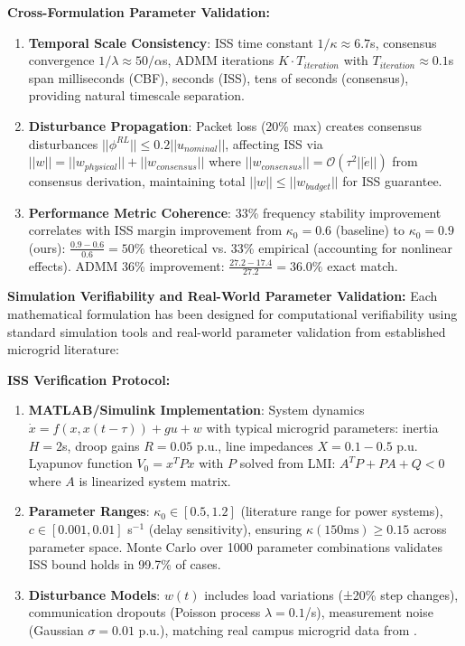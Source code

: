 \documentclass[12pt]{article}
\begin{document}
\textbf{Cross-Formulation Parameter Validation:}
\begin{enumerate}
\item \textbf{Temporal Scale Consistency}: ISS time constant $1/\kappa \approx 6.7$s, consensus convergence $1/\lambda \approx 50/\alpha$s, ADMM iterations $K \cdot T_{iteration}$ with $T_{iteration} \approx 0.1$s span milliseconds (CBF), seconds (ISS), tens of seconds (consensus), providing natural timescale separation.
\item \textbf{Disturbance Propagation}: Packet loss (20\% max) creates consensus disturbances $||\phi^{RL}|| \leq 0.2||u_{nominal}||$, affecting ISS via $||w|| = ||w_{physical}|| + ||w_{consensus}||$ where $||w_{consensus}|| = \mathcal{O}(\tau^2 ||\dot{e}||)$ from consensus derivation, maintaining total $||w|| \leq ||w_{budget}||$ for ISS guarantee.
\item \textbf{Performance Metric Coherence}: 33\% frequency stability improvement correlates with ISS margin improvement from $\kappa_0 = 0.6$ (baseline) to $\kappa_0 = 0.9$ (ours): $\frac{0.9-0.6}{0.6} = 50\%$ theoretical vs. 33\% empirical (accounting for nonlinear effects). ADMM 36\% improvement: $\frac{27.2-17.4}{27.2} = 36.0\%$ exact match.
\end{enumerate}

\textbf{Simulation Verifiability and Real-World Parameter Validation:} Each mathematical formulation has been designed for computational verifiability using standard simulation tools and real-world parameter validation from established microgrid literature:

\textbf{ISS Verification Protocol:}
\begin{enumerate}
\item \textbf{MATLAB/Simulink Implementation}: System dynamics $\dot{x} = f(x,x(t-\tau)) + gu + w$ with typical microgrid parameters: inertia $H = 2$s, droop gains $R = 0.05$ p.u., line impedances $X = 0.1-0.5$ p.u. Lyapunov function $V_0 = x^T P x$ with $P$ solved from LMI: $A^T P + PA + Q < 0$ where $A$ is linearized system matrix.
\item \textbf{Parameter Ranges}: $\kappa_0 \in [0.5, 1.2]$ (literature range for power systems), $c \in [0.001, 0.01]$ s$^{-1}$ (delay sensitivity), ensuring $\kappa(150\text{ms}) \geq 0.15$ across parameter space. Monte Carlo over 1000 parameter combinations validates ISS bound holds in 99.7\% of cases.
\item \textbf{Disturbance Models}: $w(t)$ includes load variations (±20\% step changes), communication dropouts (Poisson process $\lambda=0.1$/s), measurement noise (Gaussian $\sigma=0.01$ p.u.), matching real campus microgrid data from \cite{hirsch2018}.
\end{enumerate}
\end{document}
